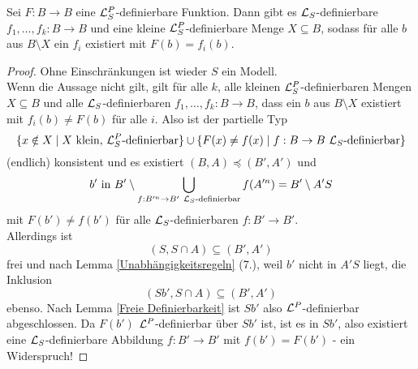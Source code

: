 \begin{lemma}
	Sei $F:B\rightarrow B$ eine $\mathcal{L}^P_S$-definierbare Funktion. Dann gibt es $\mathcal{L}_S$-definierbare $f_1,\dots,f_k:B\rightarrow B$ und eine kleine $\mathcal{L}^P_S$-definierbare Menge $X\subseteq B$, sodass für alle $b$ aus $B\setminus X$ ein $f_i$ existiert mit $F(b)=f_i(b)$.
\end{lemma}
\begin{proof}
	Ohne Einschränkungen ist wieder $S$ ein Modell.\\
	Wenn die Aussage nicht gilt, gilt für alle $k$, alle kleinen $\mathcal{L}^P_S$-definierbaren Mengen ${X\subseteq B}$ und alle $\mathcal{L}_S$-definierbaren $f_1,\dots,f_k:B\rightarrow B$, dass ein $b$ aus $B\setminus X$ existiert mit $f_i(b)\neq F(b)$ für alle $i$.\newpage
	Also ist der partielle Typ $$\{x\notin X\mid X\text{ klein, }\mathcal{L}^P_S\text{-definierbar}\}\cup\{F(x)\neq f(x)\mid f:B\rightarrow B\ \mathcal{L}_S\text{-definierbar}\}$$ (endlich) konsistent und es existiert $(B,A)\preceq(B',A')$ und $$b'\text{ in }B'\setminus\bigcup\limits_{f:B'^n\rightarrow B'\ \lingua_S\text{-definierbar}}f(A'^n)=B'\setminus A'S$$ mit $F(b')\neq f(b')$ für alle $\mathcal{L}_S$-definierbaren $f:B'\rightarrow B'$.\\
	Allerdings ist $$(S,S\cap A)\subseteq(B',A')$$ frei und nach Lemma \ref{Unabhängigkeitsregeln} (7.), weil $b'$ nicht in $A'S$ liegt, die Inklusion $$(Sb',S\cap A)\subseteq(B',A')$$ ebenso. Nach Lemma \ref{Freie Definierbarkeit} ist $Sb'$ also $\mathcal{L}^P$-definierbar abgeschlossen. Da $F(b')$ $\mathcal{L}^P$-definierbar über $Sb'$ ist, ist es in $Sb'$, also existiert eine $\mathcal{L}_S$-definierbare Abbildung $f:B'\rightarrow B'$ mit $f(b')=F(b')$ - ein Widerspruch!
\end{proof}

